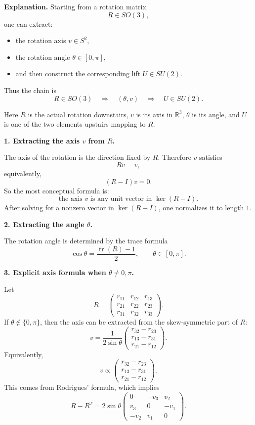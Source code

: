 \documentclass[12pt,a4paper]{article}
\theoremstyle{notespace}
\begin{document}
\textbf{Explanation.}
Starting from a rotation matrix
\[
R\in SO(3),
\]
one can extract:

\begin{itemize}
	\item the rotation axis \(v\in S^2\),
	\item the rotation angle \(\theta\in[0,\pi]\),
	\item and then construct the corresponding lift \(U\in SU(2)\).
\end{itemize}

Thus the chain is
\[
R\in SO(3)
\quad\Longrightarrow\quad
(\theta,v)
\quad\Longrightarrow\quad
U\in SU(2).
\]

Here \(R\) is the actual rotation downstairs, \(v\) is its axis in \(\mathbb R^3\), \(\theta\) is its angle, and \(U\) is one of the two elements upstairs mapping to \(R\).

\medskip

\textbf{1. Extracting the axis \(v\) from \(R\).}

The axis of the rotation is the direction fixed by \(R\). Therefore \(v\) satisfies
\[
Rv=v,
\]
equivalently,
\[
(R-I)v=0.
\]
So the most conceptual formula is:
\[
\boxed{\text{the axis }v\text{ is any unit vector in }\ker(R-I).}
\]
After solving for a nonzero vector in \(\ker(R-I)\), one normalizes it to length \(1\).

\medskip

\textbf{2. Extracting the angle \(\theta\).}

The rotation angle is determined by the trace formula
\[
\boxed{\cos\theta=\frac{\operatorname{tr}(R)-1}{2}},
\qquad
\theta\in[0,\pi].
\]

\medskip

\textbf{3. Explicit axis formula when \(\theta\neq 0,\pi\).}

Let
\[
R=
\begin{pmatrix}
	r_{11}&r_{12}&r_{13}\\
	r_{21}&r_{22}&r_{23}\\
	r_{31}&r_{32}&r_{33}
\end{pmatrix}.
\]
If \(\theta\notin\{0,\pi\}\), then the axis can be extracted from the skew-symmetric part of \(R\):
\[
\boxed{
	v=
	\frac{1}{2\sin\theta}
	\begin{pmatrix}
		r_{32}-r_{23}\\[4pt]
		r_{13}-r_{31}\\[4pt]
		r_{21}-r_{12}
	\end{pmatrix}.
}
\]
Equivalently,
\[
\boxed{
	v\propto
	\begin{pmatrix}
		r_{32}-r_{23}\\
		r_{13}-r_{31}\\
		r_{21}-r_{12}
	\end{pmatrix}.
}
\]
This comes from Rodrigues' formula, which implies
\[
R-R^T
=
2\sin\theta
\begin{pmatrix}
	0&-v_3&v_2\\
	v_3&0&-v_1\\
	-v_2&v_1&0
\end{pmatrix}.
\]
\end{document}
